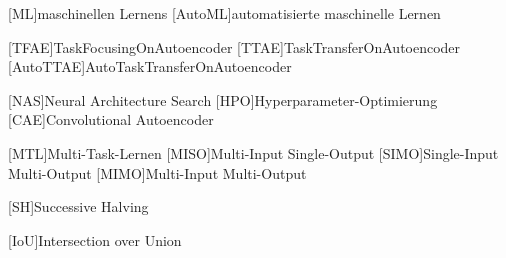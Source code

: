 \begin{acronym}[IEEE]
	[ML]{maschinellen Lernens}
	[AutoML]{automatisierte maschinelle Lernen}
	
	[TFAE]{TaskFocusingOnAutoencoder}
	[TTAE]{TaskTransferOnAutoencoder}
	[AutoTTAE]{AutoTaskTransferOnAutoencoder}
	
	[NAS]{Neural Architecture Search}
	[HPO]{Hyperparameter-Optimierung}	
	[CAE]{Convolutional Autoencoder}	
	
	
	[MTL]{Multi-Task-Lernen}		
	[MISO]{Multi-Input Single-Output}	
	[SIMO]{Single-Input Multi-Output}	
	[MIMO]{Multi-Input Multi-Output}	
	

	[SH]{Successive Halving}	
	
	[IoU]{Intersection over Union}	
\end{acronym}
